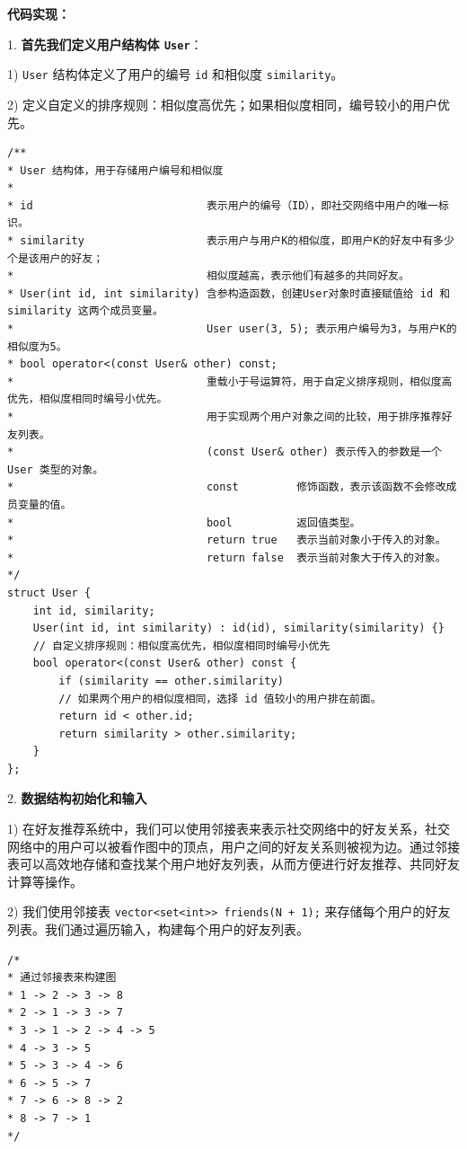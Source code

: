 \documentclass[a4paper]{ctexart}
\begin{document}
\noindent\textbf{代码实现：}

1. \textbf{首先我们定义用户结构体 \texttt{User}}：

1) \texttt{User} 结构体定义了用户的编号 \texttt{id} 和相似度 \texttt{similarity}。

2) 定义自定义的排序规则：相似度高优先；如果相似度相同，编号较小的用户优先。

\begin{lstlisting}
/**
* User 结构体，用于存储用户编号和相似度
* 
* id                           表示用户的编号（ID），即社交网络中用户的唯一标识。
* similarity                   表示用户与用户K的相似度，即用户K的好友中有多少个是该用户的好友；
*                              相似度越高，表示他们有越多的共同好友。
* User(int id, int similarity) 含参构造函数，创建User对象时直接赋值给 id 和 similarity 这两个成员变量。
*                              User user(3, 5); 表示用户编号为3，与用户K的相似度为5。
* bool operator<(const User& other) const;               
*                              重载小于号运算符，用于自定义排序规则，相似度高优先，相似度相同时编号小优先。
*                              用于实现两个用户对象之间的比较，用于排序推荐好友列表。
*                              (const User& other) 表示传入的参数是一个 User 类型的对象。
*                              const         修饰函数，表示该函数不会修改成员变量的值。
*                              bool          返回值类型。
*                              return true   表示当前对象小于传入的对象。
*                              return false  表示当前对象大于传入的对象。
*/
struct User {
	int id, similarity;
	User(int id, int similarity) : id(id), similarity(similarity) {}
	// 自定义排序规则：相似度高优先，相似度相同时编号小优先
	bool operator<(const User& other) const {
		if (similarity == other.similarity)
		// 如果两个用户的相似度相同，选择 id 值较小的用户排在前面。
		return id < other.id;
		return similarity > other.similarity;
	}
};
\end{lstlisting}

2. \textbf{数据结构初始化和输入}

1) 在好友推荐系统中，我们可以使用邻接表来表示社交网络中的好友关系，社交网络中的用户可以被看作图中的顶点，用户之间的好友关系则被视为边。通过邻接表可以高效地存储和查找某个用户地好友列表，从而方便进行好友推荐、共同好友计算等操作。

2) 我们使用邻接表 \texttt{vector<set<int>> friends(N + 1);} 来存储每个用户的好友列表。我们通过遍历输入，构建每个用户的好友列表。

\begin{lstlisting}
/*
* 通过邻接表来构建图
* 1 -> 2 -> 3 -> 8
* 2 -> 1 -> 3 -> 7
* 3 -> 1 -> 2 -> 4 -> 5
* 4 -> 3 -> 5
* 5 -> 3 -> 4 -> 6
* 6 -> 5 -> 7
* 7 -> 6 -> 8 -> 2
* 8 -> 7 -> 1
*/
\end{lstlisting}
\end{document}
